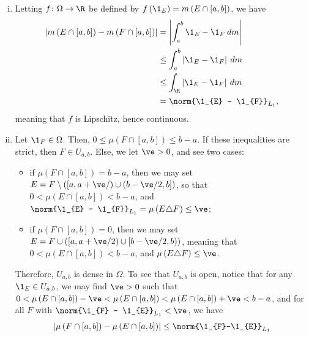 \documentclass[10pt]{mypackage}
\begin{document}
\begin{enumerate}[(i)]
  \item Letting $f\colon \Omega\rightarrow \R$ be defined by $f\left( \1_E \right) = m\left( E\cap [a,b] \right)$, we have
    \begin{align*}
      \left\vert m\left( E\cap [a,b] \right) - m\left( F\cap [a,b] \right) \right\vert &= \left\vert \int_{a}^{b} \1_{E} - \1_{F}\:dm \right\vert\\
                                                                                       &\leq \int_{a}^{b} \left\vert \1_{E} - \1_{F} \right\vert\:dm\\
                                                                                       &\leq \int_{\R}^{} \left\vert \1_{E} - \1_{F} \right\vert\:dm\\
                                                                                       &= \norm{\1_{E} - \1_{F}}_{L_1},
    \end{align*}
    meaning that $f$ is Lipschitz, hence continuous.
  \item Let $\1_{F}\in \Omega$. Then, $0 \leq \mu\left( F\cap [a,b] \right)\leq b-a$. If these inequalities are strict, then $F\in U_{a,b}$. Else, we let $\ve > 0$, and see two cases:
    \begin{itemize}
      \item if $\mu\left( F\cap [a,b] \right) = b-a$, then we may set $E = F\setminus \left( \left[a,a+\ve/\right)\cup \left( b-\ve/2,b \right] \right)$, so that $0 < \mu\left( E\cap [a,b] \right) < b-a$, and $\norm{\1_{E} - \1_{F}}_{L_1} = \mu\left( E\triangle F \right) \leq \ve$;
      \item if $\mu\left( F\cap [a,b] \right) = 0$, then we may set $E = F\cup \left( \left[ a,a+\ve/2 \right)\cup \left[ b-\ve/2,b \right) \right)$, meaning that $0 < \mu\left( E\cap [a,b] \right) < b-a$, and $\mu\left( E\triangle F \right) \leq \ve$.
    \end{itemize}
    Therefore, $U_{a,b}$ is dense in $\Omega$. To see that $U_{a,b}$ is open, notice that for any $\1_{E}\in U_{a,b}$, we may find $\ve > 0$ such that $0 < \mu\left( E\cap [a,b] \right) - \ve < \mu\left( E\cap [a,b] \right) < \mu\left( E\cap [a,b] \right) + \ve < b-a$, and for all $F$ with $\norm{\1_{F} - \1_{E}}_{L_1} < \ve$, we have
    \begin{align*}
      \left\vert \mu\left( F\cap [a,b] \right) - \mu\left( E\cap [a,b] \right) \right\vert &\leq \norm{\1_{F}-\1_{E}}_{L_1}\\

\end{align*}
\end{enumerate}
\end{document}
